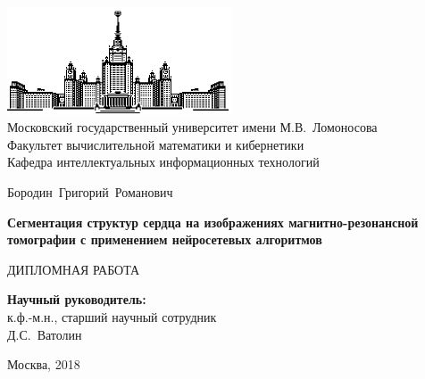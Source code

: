 \documentclass[14pt, a4paper]{extarticle}
\begin{document}
\thispagestyle{empty}

\begin{center}
\ \vspace{-3cm}

\includegraphics[width=0.5\textwidth]{img/msu.eps}\\
{Московский государственный университет имени М.В.~Ломоносова}\\
Факультет вычислительной математики и кибернетики\\
Кафедра интеллектуальных информационных технологий

\vspace{5cm}

{\Large Бородин~Григорий~Романович}

\vspace{1cm}

{\Large\bfseries
Сегментация структур сердца на изображениях магнитно-резонансной томографии с применением нейросетевых алгоритмов\\}

\vspace{1cm}

{\large ДИПЛОМНАЯ РАБОТА}
\end{center}

\vfill

\begin{flushright}
  \textbf{Научный руководитель:}\\
  к.ф.-м.н., старший научный сотрудник\\
  Д.С.~Ватолин
\end{flushright}

\vfill

\begin{center}
Москва, 2018
\end{center}

\enlargethispage{4\baselineskip}
\end{document}
